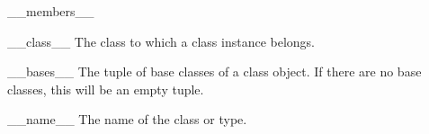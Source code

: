 \begin{memberdesc}[object]{__members__}
\end{memberdesc}

\begin{memberdesc}[instance]{__class__}
The class to which a class instance belongs.
\end{memberdesc}

\begin{memberdesc}[class]{__bases__}
The tuple of base classes of a class object.  If there are no base
classes, this will be an empty tuple.
\end{memberdesc}

\begin{memberdesc}[class]{__name__}
The name of the class or type.
\end{memberdesc}
